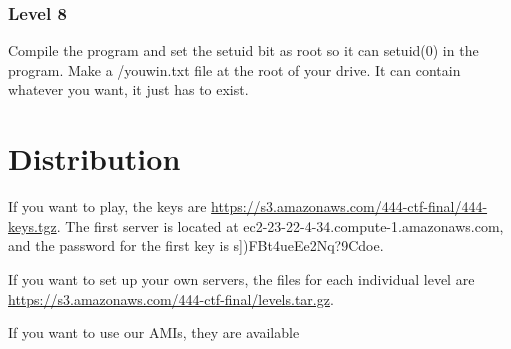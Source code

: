 \documentclass[12pt]{article}
\begin{document}
\subsubsection{Level 8}
Compile the program and set the setuid bit as root so it can setuid(0) in the
program. Make a /youwin.txt file at the root of your drive. It can contain
whatever you want, it just has to exist.
\section{Distribution}
If you want to play, the keys are \hyperref[here]{https://s3.amazonaws.com/444-ctf-final/444-keys.tgz}.  The first server is located at ec2-23-22-4-34.compute-1.amazonaws.com, and the password for the first key is s])FBt4ueEe2Nq?9Cdoe.

If you want to set up your own servers, the files for each individual level are \hyperref[here]{https://s3.amazonaws.com/444-ctf-final/levels.tar.gz}.

If you want to use our AMIs, they are available 
\end{document}
